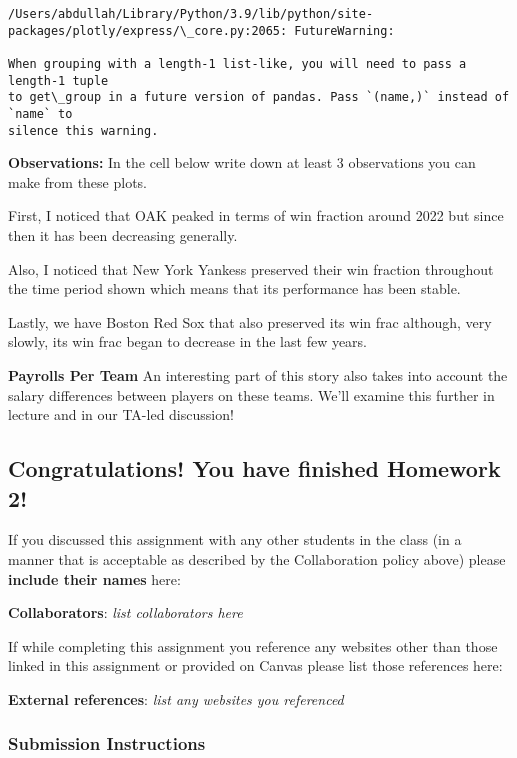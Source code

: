 \documentclass[11pt]{article}
\begin{document}
    \begin{Verbatim}[commandchars=\\\{\}]
/Users/abdullah/Library/Python/3.9/lib/python/site-
packages/plotly/express/\_core.py:2065: FutureWarning:

When grouping with a length-1 list-like, you will need to pass a length-1 tuple
to get\_group in a future version of pandas. Pass `(name,)` instead of `name` to
silence this warning.

    \end{Verbatim}

    
    
    \textbf{Observations:} In the cell below write down at least 3
observations you can make from these plots.

    First, I noticed that OAK peaked in terms of win fraction around 2022
but since then it has been decreasing generally.

Also, I noticed that New York Yankess preserved their win fraction
throughout the time period shown which means that its performance has
been stable.

Lastly, we have Boston Red Sox that also preserved its win frac
although, very slowly, its win frac began to decrease in the last few
years.

    \textbf{Payrolls Per Team} An interesting part of this story also takes
into account the salary differences between players on these teams.
We'll examine this further in lecture and in our TA-led discussion!

    \subsection{Congratulations! You have finished Homework
2!}\label{congratulations-you-have-finished-homework-2}

    If you discussed this assignment with any other students in the class
(in a manner that is acceptable as described by the Collaboration policy
above) please \textbf{include their names} here:

\textbf{Collaborators}: \emph{list collaborators here}

    If while completing this assignment you reference any websites other
than those linked in this assignment or provided on Canvas please list
those references here:

\textbf{External references}: \emph{list any websites you referenced}

    \subsubsection{Submission Instructions}\label{submission-instructions}
\end{document}
